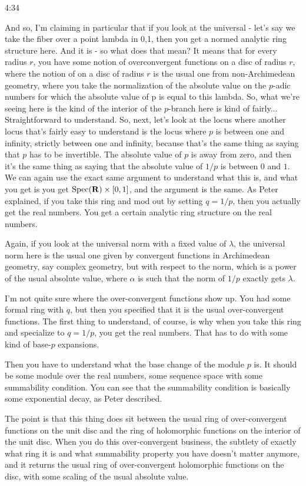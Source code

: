 \begin{unfinished}{4:34}
\begin{example}
\begin{example}
\begin{example}
And so, I'm claiming in particular that if you look at the universal - let's say we take the fiber over a point lambda in 0,1, then you get a normed analytic ring structure here. And it is - so what does that mean? It means that for every radius $r$, you have some notion of overconvergent functions on a disc of radius $r$, where the notion of on a disc of radius $r$ is the usual one from non-Archimedean geometry, where you take the normalization of the absolute value on the $p$-adic numbers for which the absolute value of p is equal to this lambda. So, what we're seeing here is the kind of the interior of the $p$-branch here is kind of fairly...
Straightforward to understand. So, next, let's look at the locus where another locus that's fairly easy to understand is the locus where $p$ is between one and infinity, strictly between one and infinity, because that's the same thing as saying that $p$ has to be invertible. The absolute value of $p$ is away from zero, and then it's the same thing as saying that the absolute value of $1/p$ is between $0$ and $1$. We can again use the exact same argument to understand what this is, and what you get is you get $\text{Spec}(\mathbf R) \times [0,1]$, and the argument is the same. As Peter explained, if you take this ring and mod out by setting $q = 1/p$, then you actually get the real numbers. You get a certain analytic ring structure on the real numbers.

Again, if you look at the universal norm with a fixed value of $\lambda$, the universal norm here is the usual one given by convergent functions in Archimedean geometry, say complex geometry, but with respect to the norm, which is a power of the usual absolute value, where $\alpha$ is such that the norm of $1/p$ exactly gets $\lambda$.

I'm not quite sure where the over-convergent functions show up. You had some formal ring with $q$, but then you specified that it is the usual over-convergent functions. The first thing to understand, of course, is why when you take this ring and specialize to $q = 1/p$, you get the real numbers. That has to do with some kind of base-$p$ expansions.

Then you have to understand what the base change of the module $p$ is. It should be some module over the real numbers, some sequence space with some summability condition. You can see that the summability condition is basically some exponential decay, as Peter described.

The point is that this thing does sit between the usual ring of over-convergent functions on the unit disc and the ring of holomorphic functions on the interior of the unit disc. When you do this over-convergent business, the subtlety of exactly what ring it is and what summability property you have doesn't matter anymore, and it returns the usual ring of over-convergent holomorphic functions on the disc, with some scaling of the usual absolute value.


\end{example}
\end{example}
\end{example}
\end{unfinished}
